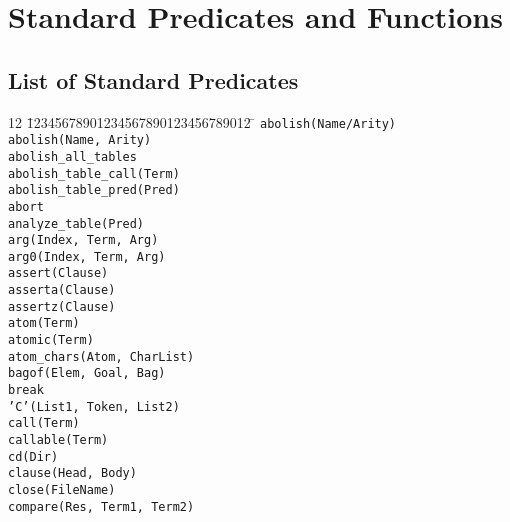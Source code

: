 \chapter{Standard Predicates and Functions} \label{standard_predicates}


\section{List of Standard Predicates}
\begin{tabbing}
12 \= 12345678901234567890123456789012 \=	\kill
 \> {\tt abolish(Name/Arity)}	\>					\\
 \> {\tt abolish(Name, Arity)}	\>					\\
 \> {\tt abolish\_all\_tables}	\>					\\
 \> {\tt abolish\_table\_call(Term)} \>					\\
 \> {\tt abolish\_table\_pred(Pred)} \>					\\
 \> {\tt abort}			\>					\\
 \> {\tt analyze\_table(Pred)}	\>					\\
 \> {\tt arg(Index, Term, Arg)}	\>					\\
 \> {\tt arg0(Index, Term, Arg)}\>					\\
 \> {\tt assert(Clause)}	\>					\\
 \> {\tt asserta(Clause)}	\>					\\
 \> {\tt assertz(Clause)}	\>					\\
 \> {\tt atom(Term)}		\>					\\
 \> {\tt atomic(Term)}		\>					\\
 \> {\tt atom\_chars(Atom, CharList)}	\>				\\
 \> {\tt bagof(Elem, Goal, Bag)}\>					\\
 \> {\tt break}			\>					\\
 \> {\tt 'C'(List1, Token, List2)} \>					\\
 \> {\tt call(Term)}		\>					\\
 \> {\tt callable(Term)}	\>					\\
 \> {\tt cd(Dir)}		\>					\\
 \> {\tt clause(Head, Body)}	\>					\\
 \> {\tt close(FileName)}	\>					\\
 \> {\tt compare(Res, Term1, Term2)} \>					\\

\end{tabbing}
